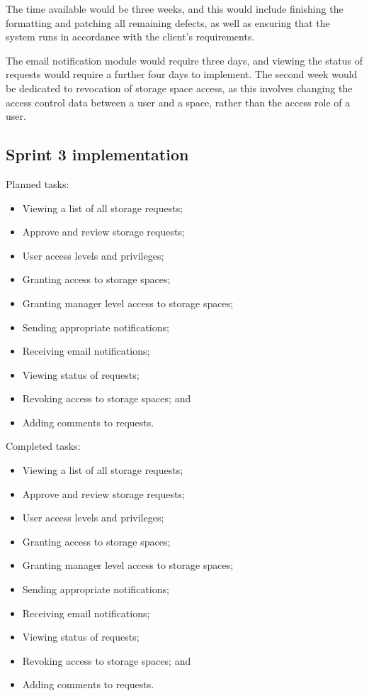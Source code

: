 \documentclass[a4paper,titlepage,12pt]{article}
\begin{document}
The time available would be three weeks, and this would include finishing the
formatting and patching all remaining defects, as well as ensuring that the
system runs in accordance with the client's requirements.

The email notification module would require three days, and viewing the status
of requests would require a further four days to implement. The second week
would be dedicated to revocation of storage space access, as this involves
changing the access control data between a user and a space, rather than the
access role of a user.

\subsection{Sprint 3 implementation}

Planned tasks:

\begin{itemize}
	\item Viewing a list of all storage requests;
	\item Approve and review storage requests;
	\item User access levels and privileges;
	\item Granting access to storage spaces;
	\item Granting manager level access to storage spaces;
	\item Sending appropriate notifications;
	\item Receiving email notifications;
	\item Viewing status of requests;
	\item Revoking access to storage spaces; and
	\item Adding comments to requests.
\end{itemize}

Completed tasks:

\begin{itemize}
	\item Viewing a list of all storage requests;
	\item Approve and review storage requests;
	\item User access levels and privileges;
	\item Granting access to storage spaces;
	\item Granting manager level access to storage spaces;
	\item Sending appropriate notifications;
	\item Receiving email notifications;
	\item Viewing status of requests;
	\item Revoking access to storage spaces; and
	\item Adding comments to requests.
\end{itemize}
\end{document}
